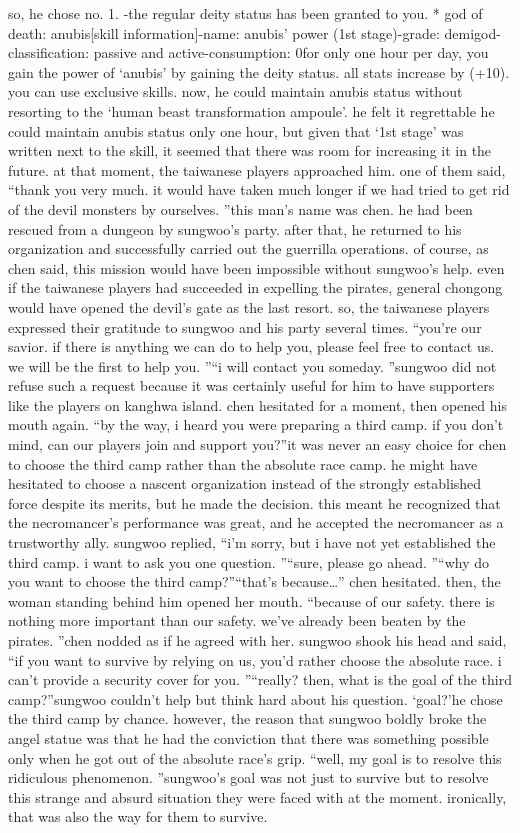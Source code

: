 so, he chose no.
 1.
-the regular deity status has been granted to you.
* god of death: anubis[skill information]-name: anubis’ power (1st stage)-grade: demigod-classification: passive and active-consumption: 0for only one hour per day, you gain the power of ‘anubis’ by gaining the deity status.
 all stats increase by (+10).
 you can use exclusive skills.
now, he could maintain anubis status without resorting to the ‘human beast transformation ampoule’.
he felt it regrettable he could maintain anubis status only one hour, but given that ‘1st stage’ was written next to the skill, it seemed that there was room for increasing it in the future.
at that moment, the taiwanese players approached him.
one of them said, “thank you very much.
 it would have taken much longer if we had tried to get rid of the devil monsters by ourselves.
”this man’s name was chen.
 he had been rescued from a dungeon by sungwoo’s party.
 after that, he returned to his organization and successfully carried out the guerrilla operations.
of course, as chen said, this mission would have been impossible without sungwoo’s help.
even if the taiwanese players had succeeded in expelling the pirates, general chongong would have opened the devil’s gate as the last resort.
so, the taiwanese players expressed their gratitude to sungwoo and his party several times.
“you’re our savior.
 if there is anything we can do to help you, please feel free to contact us.
 we will be the first to help you.
”“i will contact you someday.
”sungwoo did not refuse such a request because it was certainly useful for him to have supporters like the players on kanghwa island.
chen hesitated for a moment, then opened his mouth again.
“by the way, i heard you were preparing a third camp.
 if you don’t mind, can our players join and support you?”it was never an easy choice for chen to choose the third camp rather than the absolute race camp.
he might have hesitated to choose a nascent organization instead of the strongly established force despite its merits, but he made the decision.
 this meant he recognized that the necromancer’s performance was great, and he accepted the necromancer as a trustworthy ally.
sungwoo replied, “i’m sorry, but i have not yet established the third camp.
 i want to ask you one question.
”“sure, please go ahead.
”“why do you want to choose the third camp?”“that’s because…” chen hesitated.
then, the woman standing behind him opened her mouth.
“because of our safety.
 there is nothing more important than our safety.
 we’ve already been beaten by the pirates.
”chen nodded as if he agreed with her.
sungwoo shook his head and said, “if you want to survive by relying on us, you’d rather choose the absolute race.
 i can’t provide a security cover for you.
”“really? then, what is the goal of the third camp?”sungwoo couldn’t help but think hard about his question.
‘goal?’he chose the third camp by chance.
 however, the reason that sungwoo boldly broke the angel statue was that he had the conviction that there was something possible only when he got out of the absolute race’s grip.
“well, my goal is to resolve this ridiculous phenomenon.
”sungwoo’s goal was not just to survive but to resolve this strange and absurd situation they were faced with at the moment.
 ironically, that was also the way for them to survive.


